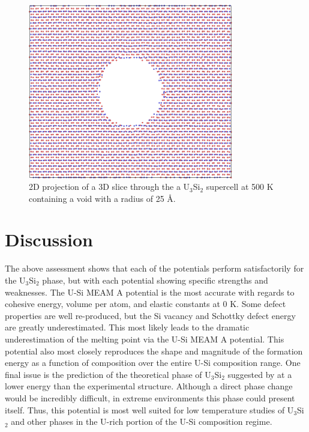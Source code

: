\documentclass[review]{elsarticle}
\begin{document}
\begin{figure}[bt]
	\centering
	\includegraphics[width=0.8\textwidth]{void3.png}
    \caption{2D projection of a 3D slice through the a U$_{3}$Si$_{2}$ supercell at 500 K containing a void with a radius of 25 {\AA}.  }\label{fig:void}
\end{figure}

\FloatBarrier
\clearpage

\section{Discussion}

The above assessment shows that each of the potentials perform satisfactorily for the U$_{3}$Si$_{2}$ phase, but with each potential showing specific strengths and weaknesses.   The U-Si MEAM A potential is the most accurate with regards to cohesive energy, volume per atom, and elastic constants at 0 K.  Some defect properties are well re-produced, but the Si vacancy and Schottky defect energy are greatly underestimated.  This most likely leads to the dramatic underestimation of the melting point via the U-Si MEAM A potential.  This potential also most closely reproduces the shape and magnitude of the formation energy as a function of composition over the entire U-Si composition range.  One final issue is the prediction of the theoretical phase of U$_{3}$Si$_{2}$ suggested by \cite{noordhoek2016} at a lower energy than the experimental structure.  Although a direct phase change would be incredibly difficult, in extreme environments this phase could present itself.  Thus, this potential is most well suited for low temperature studies of U$_{3}$Si$_{2}$ and other phases in the U-rich portion of the U-Si composition regime.  
\end{document}
